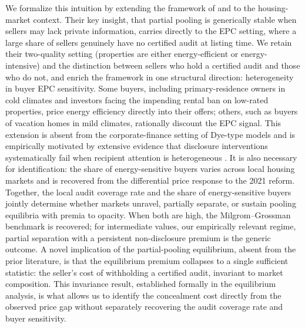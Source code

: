 \documentclass[10pt,letterpaper]{bp-template-concise}
\begin{document}
We formalize this intuition by extending the framework of \citet{dye_disclosure_1985} and \citet{jung_kwon_1988} to the housing-market context. Their key insight, that partial pooling is generically stable when sellers may lack private information, carries directly to the EPC setting, where a large share of sellers genuinely have no certified audit at listing time. We retain their two-quality setting (properties are either energy-efficient or energy-intensive) and the distinction between sellers who hold a certified audit and those who do not, and enrich the framework in one structural direction: heterogeneity in buyer EPC sensitivity. Some buyers, including primary-residence owners in cold climates and investors facing the impending rental ban on low-rated properties, price energy efficiency directly into their offers; others, such as buyers of vacation homes in mild climates, rationally discount the EPC signal. This extension is absent from the corporate-finance setting of Dye-type models and is empirically motivated by extensive evidence that disclosure interventions systematically fail when recipient attention is heterogeneous \citep{loewenstein_disclosure_2014, benshahar_failure_2011, fishman_mandatory_2003}. It is also necessary for identification: the share of energy-sensitive buyers varies across local housing markets and is recovered from the differential price response to the 2021 reform. Together, the local audit coverage rate and the share of energy-sensitive buyers jointly determine whether markets unravel, partially separate, or sustain pooling equilibria with premia to opacity. When both are high, the Milgrom--Grossman benchmark is recovered; for intermediate values, our empirically relevant regime, partial separation with a persistent non-disclosure premium is the generic outcome. A novel implication of the partial-pooling equilibrium, absent from the prior literature, is that the equilibrium premium collapses to a single sufficient statistic: the seller's cost of withholding a certified audit, invariant to market composition. This invariance result, established formally in the equilibrium analysis, is what allows us to identify the concealment cost directly from the observed price gap without separately recovering the audit coverage rate and buyer sensitivity.
\end{document}

